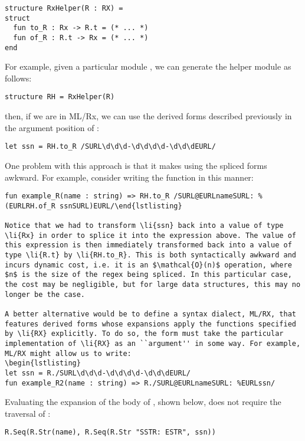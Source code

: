 {{\begin{lstlisting}[numbers=none]
structure RxHelper(R : RX) = 
struct
  fun to_R : Rx -> R.t = (* ... *)
  fun of_R : R.t -> Rx = (* ... *)
end
\end{lstlisting}

For example, given a particular module , we can generate the helper module  as follows:

\begin{lstlisting}[numbers=none]
structure RH = RxHelper(R)
\end{lstlisting}

then, if we are in ML/Rx, we can use the derived forms described previously in the argument position of :

\begin{lstlisting}[numbers=none]
let ssn = RH.to_R /SURL\d\d\d-\d\d\d\d-\d\d\dEURL/
\end{lstlisting}

One problem with this approach is that it makes using the spliced forms awkward. For example, consider writing the function  in this manner:

\begin{lstlisting}[numbers=none]
fun example_R(name : string) => RH.to_R /SURL@EURLnameSURL: %(EURLRH.of_R ssnSURL)EURL/\end{lstlisting}

Notice that we had to transform \li{ssn} back into a value of type \li{Rx} in order to splice it into the expression above. The value of this expression is then immediately transformed back into a value of type \li{R.t} by \li{RH.to_R}. This is both syntactically awkward and incurs dynamic cost, i.e. it is an $\mathcal{O}(n)$ operation, where $n$ is the size of the regex being spliced. In this particular case, the cost may be negligible, but for large data structures, this may no longer be the case.

A better alternative would be to define a syntax dialect, ML/RX, that features derived forms whose expansions apply the functions specified by \li{RX} explicitly. To do so, the form must take the particular implementation of \li{RX} as an ``argument'' in some way. For example, ML/RX might allow us to write:
\begin{lstlisting}
let ssn = R./SURL\d\d\d-\d\d\d\d-\d\d\dEURL/
fun example_R2(name : string) => R./SURL@EURLnameSURL: %EURLssn/
\end{lstlisting}

Evaluating the expansion of the body of , shown below,  does not require the traversal of :
\begin{lstlisting}[numbers=none]
R.Seq(R.Str(name), R.Seq(R.Str "SSTR: ESTR", ssn))
\end{lstlisting}

}}
